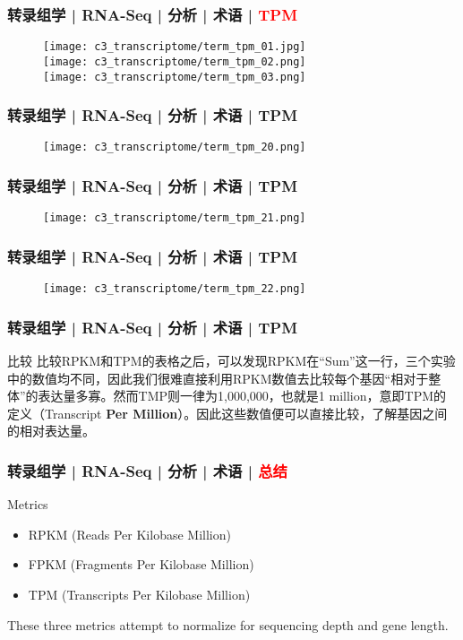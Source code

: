 \begin{frame}
  \frametitle{转录组学 | RNA-Seq | 分析 | 术语 | \textcolor{red}{TPM}}
  \begin{figure}
    \centering
    \texttt{[image: c3\_transcriptome/term\_tpm\_01.jpg]}\\
    \texttt{[image: c3\_transcriptome/term\_tpm\_02.png]}\\
    \texttt{[image: c3\_transcriptome/term\_tpm\_03.png]}
  \end{figure}
\end{frame}

\begin{frame}
  \frametitle{转录组学 | RNA-Seq | 分析 | 术语 | TPM}
  \begin{figure}
    \centering
    \texttt{[image: c3\_transcriptome/term\_tpm\_20.png]}
  \end{figure}
\end{frame}

\begin{frame}
  \frametitle{转录组学 | RNA-Seq | 分析 | 术语 | TPM}
  \begin{figure}
    \centering
    \texttt{[image: c3\_transcriptome/term\_tpm\_21.png]}
  \end{figure}
\end{frame}

\begin{frame}
  \frametitle{转录组学 | RNA-Seq | 分析 | 术语 | TPM}
  \begin{figure}
    \centering
    \texttt{[image: c3\_transcriptome/term\_tpm\_22.png]}
  \end{figure}
\end{frame}

\begin{frame}
  \frametitle{转录组学 | RNA-Seq | 分析 | 术语 | TPM}
  \begin{block}{比较}
比较RPKM和TPM的表格之后，可以发现RPKM在“Sum”这一行，三个实验中的数值均不同，因此我们很难直接利用RPKM数值去比较每个基因“相对于整体”的表达量多寡。然而TMP则一律为1,000,000，也就是1 million，意即TPM的定义（Transcript \textbf{Per Million}）。因此这些数值便可以直接比较，了解基因之间的相对表达量。
  \end{block}
\end{frame}

\begin{frame}
  \frametitle{转录组学 | RNA-Seq | 分析 | 术语 | \textcolor{red}{总结}}
  \begin{block}{Metrics}
    \begin{itemize}
      \item RPKM (Reads Per Kilobase Million)
      \item FPKM (Fragments Per Kilobase Million)
      \item TPM (Transcripts Per Kilobase Million)
    \end{itemize}
        These three metrics attempt to normalize for sequencing depth and gene length. 
  \end{block}
\end{frame}

